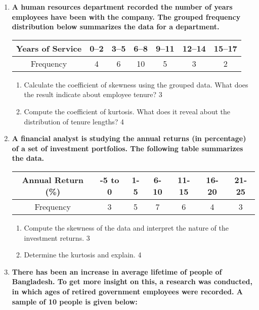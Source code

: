 \documentclass[a4paper,oneside]{book}
\begin{document}
\begin{enumerate}
  \item  
\textbf{A human resources department recorded the number of years employees have been with the company. The grouped frequency distribution below summarizes the data for a department.}  

\begin{table}[h]
\centering
\begin{tabular}{c|c|c|c|c|c|c}
Years of Service & 0–2 & 3–5 & 6–8 & 9–11 & 12–14 & 15–17 \\ \hline
Frequency & 4 & 6 & 10 & 5 & 3 & 2
\end{tabular}
\end{table}

\begin{enumerate}
  \item  
  Calculate the coefficient of skewness using the grouped data. What does the result indicate about employee tenure? \hfill 3

  \item  
  Compute the coefficient of kurtosis. What does it reveal about the distribution of tenure lengths? \hfill 4
\end{enumerate}

  
  \item  
  \textbf{A financial analyst is studying the annual returns (in percentage) of a set of investment portfolios. The following table summarizes the data.}  

\begin{table}[h]
\centering
\begin{tabular}{c|cccccc}
Annual Return (\%) & -5 to 0 & 1-5 & 6-10 & 11-15 & 16-20 & 21-25 \\ \hline
Frequency & 3 & 5 & 7 & 6 & 4 & 3
\end{tabular}
\end{table}

  \begin{enumerate}
    \item  
	Compute the skewness of the data and interpret the nature of the investment returns.  \hfill 3  
    \item  
	Determine the kurtosis and explain.  \hfill 4  
  \end{enumerate}  



   \item
	  \textbf{There has been an increase in average lifetime of people of Bangladesh. To get more insight on this, a research was conducted, in which ages of retired government employees were recorded. A sample of 10 people is given below:}
	  

\end{enumerate}
\end{document}
